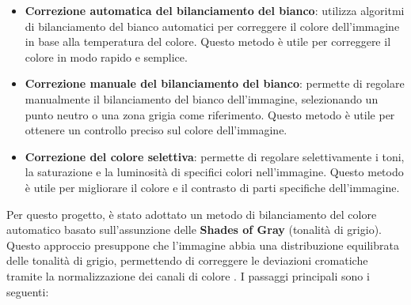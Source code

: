 \begin{itemize}
    \item \textbf{Correzione automatica del bilanciamento del bianco}: utilizza algoritmi di bilanciamento del bianco automatici per correggere il colore dell'immagine in base alla temperatura del colore. Questo metodo è utile per correggere il colore in modo rapido e semplice.
    \item \textbf{Correzione manuale del bilanciamento del bianco}: permette di regolare manualmente il bilanciamento del bianco dell'immagine, selezionando un punto neutro o una zona grigia come riferimento. Questo metodo è utile per ottenere un controllo preciso sul colore dell'immagine.
    \item \textbf{Correzione del colore selettiva}: permette di regolare selettivamente i toni, la saturazione e la luminosità di specifici colori nell'immagine. Questo metodo è utile per migliorare il colore e il contrasto di parti specifiche dell'immagine.
\end{itemize}

Per questo progetto, è stato adottato un metodo di bilanciamento del colore automatico basato sull'assunzione delle \textbf{Shades of Gray} (tonalità di grigio). Questo approccio presuppone che l'immagine abbia una distribuzione equilibrata delle tonalità di grigio, permettendo di correggere le deviazioni cromatiche tramite la normalizzazione dei canali di colore \cite{shades_of_gray}. I passaggi principali sono i seguenti:


